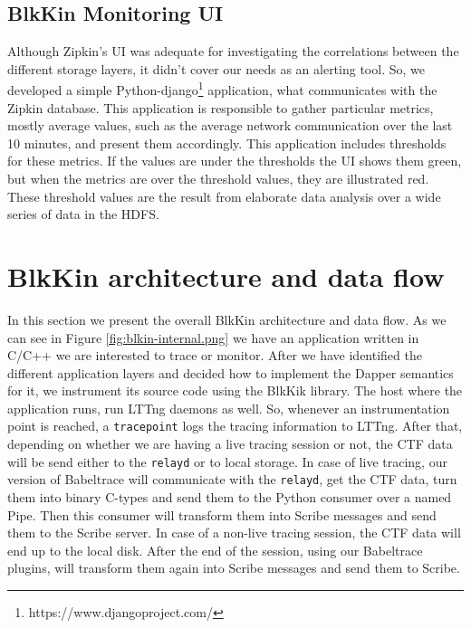 \subsection{BlkKin Monitoring UI}
Although Zipkin's UI was adequate for investigating the correlations between the
different storage layers, it didn't cover our needs as an alerting tool. So, we
developed a simple Python-django\footnote{https://www.djangoproject.com/}
application, what communicates with the Zipkin database. This application is
responsible to gather particular metrics, mostly average values, such as the
average network communication over the last 10 minutes, and present them
accordingly. This application includes thresholds for these metrics. If the
values are under the thresholds the UI shows them green, but when the metrics
are over the threshold values, they are illustrated red. These threshold values
are the result from elaborate data analysis over a wide series of data in the
HDFS.

\section{BlkKin architecture and data flow}\label{sec:flow}

In this section we present the overall BlkKin architecture and data flow. As we
can see in Figure \ref{fig:blkin-internal.png} we have an application written in
C/C++ we are interested to trace or monitor. After we have identified the
different application layers and decided how to implement the Dapper semantics
for it, we instrument its source code using the BlkKik library. The host where
the application runs, run LTTng daemons as well. So, whenever an instrumentation
point is reached, a \texttt{tracepoint} logs the tracing information to LTTng.
After that, depending on whether we are having a live tracing session or not,
the CTF data will be send either to the \texttt{relayd} or to local storage. In
case of live tracing, our version of Babeltrace will communicate with the
\texttt{relayd}, get the CTF data, turn them into binary C-types and send them
to the Python consumer over a named Pipe. Then this consumer will transform them
into Scribe messages and send them to the Scribe server. In case of a non-live
tracing session, the CTF data will end up to the local disk. After the end of
the session, using our Babeltrace plugins, will transform them again into Scribe
messages and send them to Scribe.


